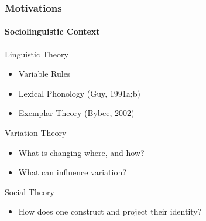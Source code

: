 \documentclass[]{beamer}
\begin{document}
\begin{frame}
	\frametitle{Motivations}
	\framesubtitle{Sociolinguistic Context}
	
	\begin{block}{Linguistic Theory}
		\begin{itemize}
			\item Variable Rules
			\item Lexical Phonology (Guy, 1991a;b)
			\item Exemplar Theory (Bybee, 2002)
		\end{itemize}
	\end{block}
	
	\begin{block}{Variation Theory}
		\begin{itemize}
			\item What is changing where, and how?
			\item What can influence variation?
		\end{itemize}
	\end{block}
	
	\begin{block}{Social Theory}
		\begin{itemize}
			\item How does one construct and project their identity?
		\end{itemize}
	\end{block}
\end{frame}

\end{document}

